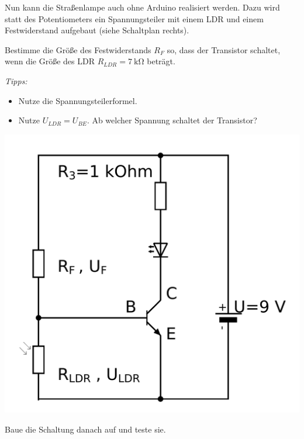 \begin{projekt}
	\begin{minipage}{0.58\textwidth}
		Nun kann die Straßenlampe auch ohne Arduino realisiert werden. Dazu wird statt des Potentiometers ein Spannungsteiler mit einem LDR und einem Festwiderstand aufgebaut (siehe Schaltplan rechts).
		
		Bestimme die Größe des Festwiderstands $R_F$ so, dass der Transistor schaltet, wenn die Größe des LDR $R_{LDR}=\SI{7}{\kilo\ohm}$ beträgt.
		
		\emph{Tipps:}
		\begin{itemize}[itemsep=0mm, parsep=0mm]
			\item Nutze die Spannungsteilerformel.
			\item Nutze $U_{LDR}=U_{BE}$. Ab welcher Spannung schaltet der Transistor?
		\end{itemize}
	\end{minipage}
	\hfill
	\begin{minipage}{0.4\textwidth}
		\centering
		\includegraphics[width=\textwidth]{./Zeichnungen/Schaltplan-Strassenlampe-ohne-mC.png}
	\end{minipage}
	
	\bigskip
	Baue die Schaltung danach auf und teste sie.
\end{projekt}

